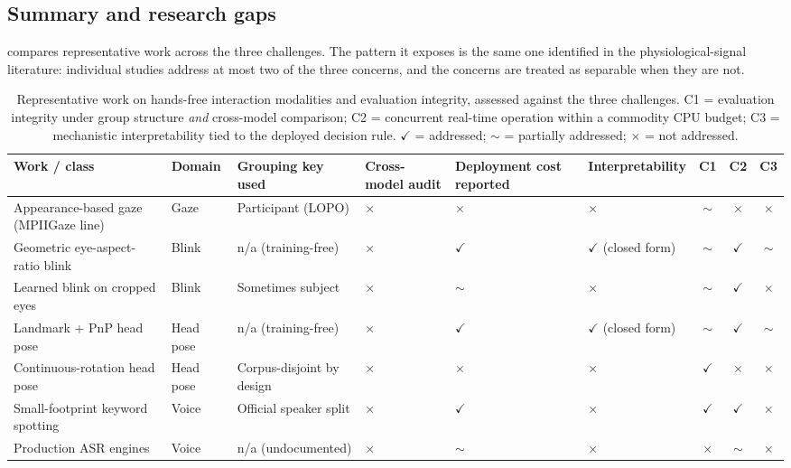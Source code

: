 \FloatBarrier

\subsection{Summary and research gaps}

 compares representative work across the three challenges. The pattern it exposes is the same one identified in the physiological-signal literature: individual studies address at most two of the three concerns, and the concerns are treated as separable when they are not.

\begin{table}[pos=htbp]
\centering
\caption{Representative work on hands-free interaction modalities and evaluation integrity, assessed against the three challenges. C1 = evaluation integrity under group structure \emph{and} cross-model comparison; C2 = concurrent real-time operation within a commodity CPU budget; C3 = mechanistic interpretability tied to the deployed decision rule. $\checkmark$ = addressed; $\sim$ = partially addressed; $\times$ = not addressed.}
\label{tab:2}
\scriptsize
\begin{tabularx}{\textwidth}{XXXXXXccc}
\toprule
\textbf{Work / class} & \textbf{Domain} & \textbf{Grouping key used} & \textbf{Cross-model audit} & \textbf{Deployment cost reported} & \textbf{Interpretability} & \textbf{C1} & \textbf{C2} & \textbf{C3} \\
\midrule
Appearance-based gaze (MPIIGaze line) & Gaze & Participant (LOPO) & $\times$ & $\times$ & $\times$ & $\sim$ & $\times$ & $\times$ \\
Geometric eye-aspect-ratio blink & Blink & n/a (training-free) & $\times$ & $\checkmark$ & $\checkmark$ (closed form) & $\sim$ & $\checkmark$ & $\sim$ \\
Learned blink on cropped eyes & Blink & Sometimes subject & $\times$ & $\sim$ & $\times$ & $\sim$ & $\checkmark$ & $\times$ \\
Landmark + PnP head pose & Head pose & n/a (training-free) & $\times$ & $\checkmark$ & $\checkmark$ (closed form) & $\sim$ & $\checkmark$ & $\sim$ \\
Continuous-rotation head pose & Head pose & Corpus-disjoint by design & $\times$ & $\times$ & $\times$ & $\checkmark$ & $\times$ & $\times$ \\
Small-footprint keyword spotting & Voice & Official speaker split & $\times$ & $\checkmark$ & $\times$ & $\checkmark$ & $\checkmark$ & $\times$ \\
Production ASR engines & Voice & n/a (undocumented) & $\times$ & $\sim$ & $\times$ & $\times$ & $\sim$ & $\times$ \\

\end{tabularx}
\end{table}
